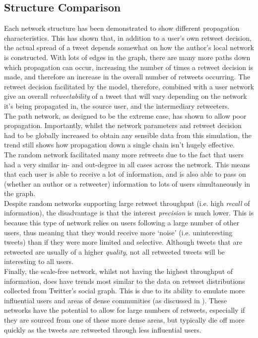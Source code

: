 \subsection{Structure Comparison}
Each network structure has been demonstrated to show different propagation characteristics. This has shown that, in addition to a user's own retweet decision, the actual spread of a tweet depends somewhat on how the author's local network is constructed. With lots of edges in the graph, there are many more paths down which propagation can occur, increasing the number of times a retweet decision is made, and therefore an increase in the overall number of retweets occurring. The retweet decision facilitated by the model, therefore, combined with a user network give an overall \textit{retweetability} of a tweet that will vary depending on the network it's being propagated in, the source user, and the intermediary retweeters.
\\
The path network, as designed to be the extreme case, has shown to allow poor propagation. Importantly, whilst the network parameters and retweet decision had to be globally increased to obtain any sensible data from this simulation, the trend still shows how propagation down a single chain isn't hugely effective.
\\
The random network facilitated many more retweets due to the fact that users had a very similar in- and out-degree in all cases across the network. This means that each user is able to receive a lot of information, and is also able to pass on (whether an author or a retweeter) information to lots of users simultaneously in the graph. 
\\ 
Despite random networks supporting large retweet throughput (i.e. high \emph{recall} of information), the disadvantage is that the interest \emph{precision}  is much lower. This is because this type of network relies on users following a large number of other users, thus meaning that they would receive more `noise' (i.e. uninteresting tweets) than if they were more limited and selective. Although tweets that are retweeted are usually of a higher \emph{quality}, not all retweeted tweets will be interesting to all users.
\\
Finally, the scale-free network, whilst not having the highest throughput of information, does have trends most similar to the data on retweet distributions collected from Twitter's social graph. This is due to its ability to emulate more influential users and areas of dense communities (as discussed in \cite{java07}). These networks have the potential to allow for large numbers of retweets, especially if they are sourced from one of these more dense areas, but typically die off more quickly as the tweets are retweeted through less influential users.


